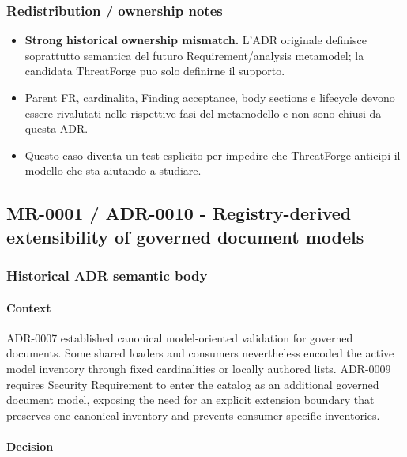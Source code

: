 \documentclass[
  10pt,
]{article}
\providecommand{\tightlist}{%
  \setlength{\itemsep}{0pt}\setlength{\parskip}{0pt}}
\begin{document}
\subsubsection{Redistribution / ownership
notes}\label{redistribution-ownership-notes-7}

\begin{itemize}
\tightlist
\item
  \textbf{Strong historical ownership mismatch.} L'ADR originale
  definisce soprattutto semantica del futuro Requirement/analysis
  metamodel; la candidata ThreatForge puo solo definirne il supporto.
\item
  Parent FR, cardinalita, Finding acceptance, body sections e lifecycle
  devono essere rivalutati nelle rispettive fasi del metamodello e non
  sono chiusi da questa ADR.
\item
  Questo caso diventa un test esplicito per impedire che ThreatForge
  anticipi il modello che sta aiutando a studiare.
\end{itemize}

\subsection{MR-0001 / ADR-0010 - Registry-derived extensibility of
governed document
models}\label{mr-0001-adr-0010---registry-derived-extensibility-of-governed-document-models}

\subsubsection{Historical ADR semantic
body}\label{historical-adr-semantic-body-8}

\paragraph{Context}\label{context-16}

ADR-0007 established canonical model-oriented validation for governed
documents. Some shared loaders and consumers nevertheless encoded the
active model inventory through fixed cardinalities or locally authored
lists. ADR-0009 requires Security Requirement to enter the catalog as an
additional governed document model, exposing the need for an explicit
extension boundary that preserves one canonical inventory and prevents
consumer-specific inventories.

\paragraph{Decision}\label{decision-16}
\end{document}

